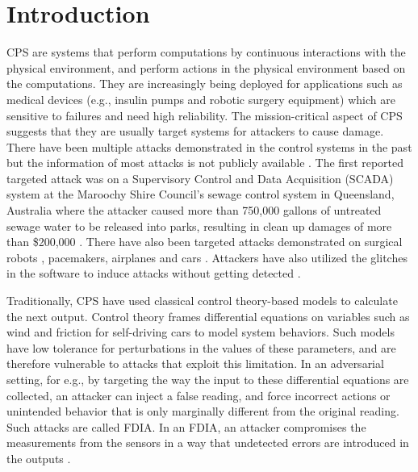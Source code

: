 
\chapter{Introduction }
\label{ch:Chapter1}
\ac{CPS} are systems that perform computations by continuous interactions with the physical environment, and perform actions in the physical environment based on the computations.   
They are increasingly being deployed for applications \cite{10.1145/2038642.2038685}\cite{10.1145/1837274.1837463} \cite{6051465} such as medical devices (e.g., insulin pumps and robotic surgery equipment) which are sensitive to failures and need high reliability. 
The mission-critical aspect of \ac{CPS} suggests that they are usually target systems for attackers to cause damage. 
There have been multiple attacks demonstrated in the control systems in the past but the information of most attacks is not publicly available \cite{doi:10.1080/13518040590969785}.
The first reported targeted attack was on a Supervisory Control and Data Acquisition (SCADA) system \cite{article22} at the Maroochy Shire Council’s sewage control system in Queensland, Australia where the attacker caused more than 750,000 gallons of untreated sewage water to be released into parks, resulting in clean up damages of more than \$200,000 \cite{10.1016/j.adhoc.2009.04.012}.
There have also been targeted attacks demonstrated on surgical robots \cite{7579758}, pacemakers\cite{4531149}, airplanes \cite{217595} and  cars \cite{10.5555/1929820.1929848}.
Attackers have also utilized the glitches in the software to induce attacks without getting detected \cite{242054}. 


Traditionally, \ac{CPS} have used classical control theory-based models  \cite{1337806} \cite{10.1145/2038642.2038667} \cite{6051465} to calculate the next output. 
Control theory frames differential equations on variables such as wind and friction for self-driving cars to model system behaviors. 
Such models have low tolerance for perturbations in the values of these parameters, and are therefore vulnerable to attacks that exploit this limitation. 
In an adversarial setting, for e.g., by targeting the way the input to these differential equations are collected, an attacker can inject a false reading, and force incorrect actions or unintended behavior that is only marginally different from the original reading. 
Such attacks are called \ac{FDIA}. In an \ac{FDIA}, an attacker compromises the measurements from the sensors in a way that undetected errors are introduced in the outputs \cite{7438916}. 


